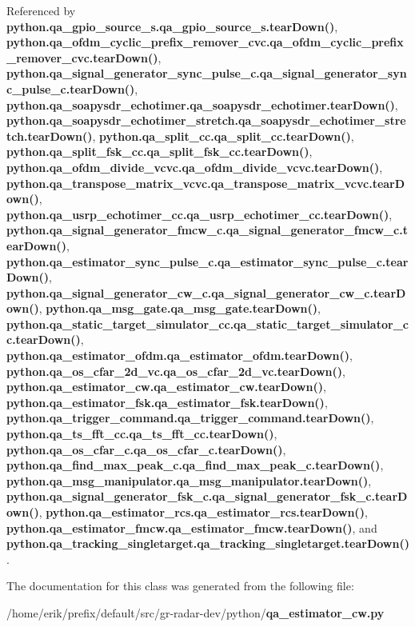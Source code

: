 Referenced by {\bf python.\+qa\+\_\+gpio\+\_\+source\+\_\+s.\+qa\+\_\+gpio\+\_\+source\+\_\+s.\+tear\+Down()}, {\bf python.\+qa\+\_\+ofdm\+\_\+cyclic\+\_\+prefix\+\_\+remover\+\_\+cvc.\+qa\+\_\+ofdm\+\_\+cyclic\+\_\+prefix\+\_\+remover\+\_\+cvc.\+tear\+Down()}, {\bf python.\+qa\+\_\+signal\+\_\+generator\+\_\+sync\+\_\+pulse\+\_\+c.\+qa\+\_\+signal\+\_\+generator\+\_\+sync\+\_\+pulse\+\_\+c.\+tear\+Down()}, {\bf python.\+qa\+\_\+soapysdr\+\_\+echotimer.\+qa\+\_\+soapysdr\+\_\+echotimer.\+tear\+Down()}, {\bf python.\+qa\+\_\+soapysdr\+\_\+echotimer\+\_\+stretch.\+qa\+\_\+soapysdr\+\_\+echotimer\+\_\+stretch.\+tear\+Down()}, {\bf python.\+qa\+\_\+split\+\_\+cc.\+qa\+\_\+split\+\_\+cc.\+tear\+Down()}, {\bf python.\+qa\+\_\+split\+\_\+fsk\+\_\+cc.\+qa\+\_\+split\+\_\+fsk\+\_\+cc.\+tear\+Down()}, {\bf python.\+qa\+\_\+ofdm\+\_\+divide\+\_\+vcvc.\+qa\+\_\+ofdm\+\_\+divide\+\_\+vcvc.\+tear\+Down()}, {\bf python.\+qa\+\_\+transpose\+\_\+matrix\+\_\+vcvc.\+qa\+\_\+transpose\+\_\+matrix\+\_\+vcvc.\+tear\+Down()}, {\bf python.\+qa\+\_\+usrp\+\_\+echotimer\+\_\+cc.\+qa\+\_\+usrp\+\_\+echotimer\+\_\+cc.\+tear\+Down()}, {\bf python.\+qa\+\_\+signal\+\_\+generator\+\_\+fmcw\+\_\+c.\+qa\+\_\+signal\+\_\+generator\+\_\+fmcw\+\_\+c.\+tear\+Down()}, {\bf python.\+qa\+\_\+estimator\+\_\+sync\+\_\+pulse\+\_\+c.\+qa\+\_\+estimator\+\_\+sync\+\_\+pulse\+\_\+c.\+tear\+Down()}, {\bf python.\+qa\+\_\+signal\+\_\+generator\+\_\+cw\+\_\+c.\+qa\+\_\+signal\+\_\+generator\+\_\+cw\+\_\+c.\+tear\+Down()}, {\bf python.\+qa\+\_\+msg\+\_\+gate.\+qa\+\_\+msg\+\_\+gate.\+tear\+Down()}, {\bf python.\+qa\+\_\+static\+\_\+target\+\_\+simulator\+\_\+cc.\+qa\+\_\+static\+\_\+target\+\_\+simulator\+\_\+cc.\+tear\+Down()}, {\bf python.\+qa\+\_\+estimator\+\_\+ofdm.\+qa\+\_\+estimator\+\_\+ofdm.\+tear\+Down()}, {\bf python.\+qa\+\_\+os\+\_\+cfar\+\_\+2d\+\_\+vc.\+qa\+\_\+os\+\_\+cfar\+\_\+2d\+\_\+vc.\+tear\+Down()}, {\bf python.\+qa\+\_\+estimator\+\_\+cw.\+qa\+\_\+estimator\+\_\+cw.\+tear\+Down()}, {\bf python.\+qa\+\_\+estimator\+\_\+fsk.\+qa\+\_\+estimator\+\_\+fsk.\+tear\+Down()}, {\bf python.\+qa\+\_\+trigger\+\_\+command.\+qa\+\_\+trigger\+\_\+command.\+tear\+Down()}, {\bf python.\+qa\+\_\+ts\+\_\+fft\+\_\+cc.\+qa\+\_\+ts\+\_\+fft\+\_\+cc.\+tear\+Down()}, {\bf python.\+qa\+\_\+os\+\_\+cfar\+\_\+c.\+qa\+\_\+os\+\_\+cfar\+\_\+c.\+tear\+Down()}, {\bf python.\+qa\+\_\+find\+\_\+max\+\_\+peak\+\_\+c.\+qa\+\_\+find\+\_\+max\+\_\+peak\+\_\+c.\+tear\+Down()}, {\bf python.\+qa\+\_\+msg\+\_\+manipulator.\+qa\+\_\+msg\+\_\+manipulator.\+tear\+Down()}, {\bf python.\+qa\+\_\+signal\+\_\+generator\+\_\+fsk\+\_\+c.\+qa\+\_\+signal\+\_\+generator\+\_\+fsk\+\_\+c.\+tear\+Down()}, {\bf python.\+qa\+\_\+estimator\+\_\+rcs.\+qa\+\_\+estimator\+\_\+rcs.\+tear\+Down()}, {\bf python.\+qa\+\_\+estimator\+\_\+fmcw.\+qa\+\_\+estimator\+\_\+fmcw.\+tear\+Down()}, and {\bf python.\+qa\+\_\+tracking\+\_\+singletarget.\+qa\+\_\+tracking\+\_\+singletarget.\+tear\+Down()}.



The documentation for this class was generated from the following file\+:\begin{DoxyCompactItemize}
\item 
/home/erik/prefix/default/src/gr-\/radar-\/dev/python/{\bf qa\+\_\+estimator\+\_\+cw.\+py}\end{DoxyCompactItemize}
